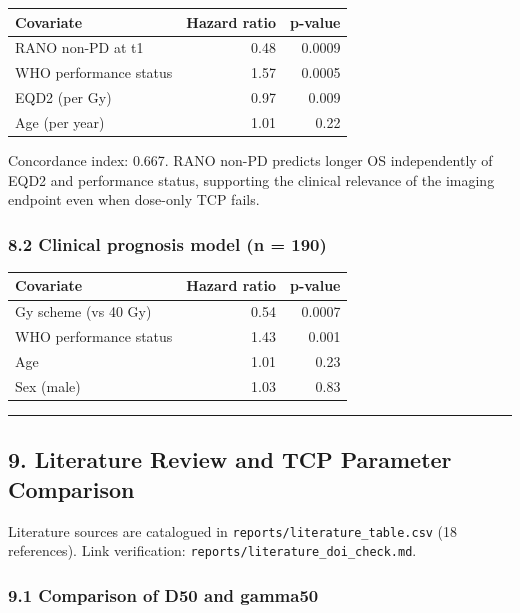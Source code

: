\documentclass[
  11pt,
]{article}
\begin{document}
\begin{longtable}[]{@{}lrr@{}}
\toprule\noalign{}
Covariate & Hazard ratio & p-value \\
\midrule\noalign{}
\endhead
\bottomrule\noalign{}
\endlastfoot
RANO non-PD at t1 & 0.48 & 0.0009 \\
WHO performance status & 1.57 & 0.0005 \\
EQD2 (per Gy) & 0.97 & 0.009 \\
Age (per year) & 1.01 & 0.22 \\
\end{longtable}

Concordance index: 0.667. RANO non-PD predicts longer OS independently
of EQD2 and performance status, supporting the clinical relevance of the
imaging endpoint even when dose-only TCP fails.

\subsubsection{8.2 Clinical prognosis model (n =
190)}\label{clinical-prognosis-model-n-190}

\begin{longtable}[]{@{}lrr@{}}
\toprule\noalign{}
Covariate & Hazard ratio & p-value \\
\midrule\noalign{}
\endhead
\bottomrule\noalign{}
\endlastfoot
60 Gy scheme (vs 40 Gy) & 0.54 & 0.0007 \\
WHO performance status & 1.43 & 0.001 \\
Age & 1.01 & 0.23 \\
Sex (male) & 1.03 & 0.83 \\
\end{longtable}

\begin{center}\rule{0.5\linewidth}{0.5pt}\end{center}

\subsection{9. Literature Review and TCP Parameter
Comparison}\label{literature-review-and-tcp-parameter-comparison}

Literature sources are catalogued in
\texttt{reports/literature\_table.csv} (18 references). Link
verification: \texttt{reports/literature\_doi\_check.md}.

\subsubsection{9.1 Comparison of D50 and
gamma50}\label{comparison-of-d50-and-gamma50}
\end{document}
